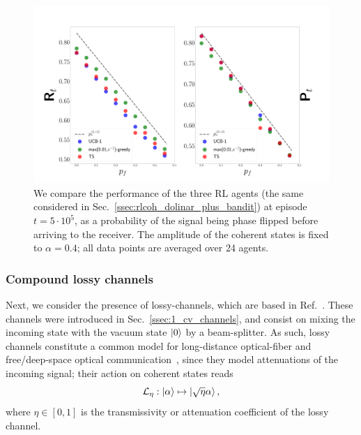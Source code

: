 \begin{figure}[t!]
    \centering
    \includegraphics[width=1.\textwidth]{Figures/318/flips.pdf}
   \caption{We compare the performance of the three RL agents (the same considered in Sec.~\ref{ssec:rlcoh_dolinar_plus_bandit}) at episode $t= 5\cdot 10^{5}$, as a probability of the signal being phase flipped before arriving to the receiver. The amplitude of the coherent states is fixed to $\alpha = 0.4$; all data points are averaged over 24 agents.}
    \label{fig:dfResults}
\end{figure}

\subsubsection{Compound lossy channels}

Next, we consider the presence of lossy-channels, which are based in Ref.~\cite{bilkisitw}. These channels were introduced in Sec.~\ref{ssec:1_cv_channels}, and consist on mixing the incoming state with the vacuum state $\ket{0}$ by a beam-splitter. As such, lossy channels constitute a common model for long-distance optical-fiber and free/deep-space optical communication~\cite{Dequal2020,Andrews2005,Usenko2012a,Pirandola2021,Pirandola2021a,Vasylyev2011,Vasylyev2017}, since they model attenuations of the incoming signal; their action on coherent states reads
\begin{equation}
{\cal L}_\eta:\ket \alpha\mapsto \ket{\sqrt\eta \alpha},
\end{equation}
where $\eta\in[0,1]$ is the transmissivity or attenuation coefficient of the lossy channel.

